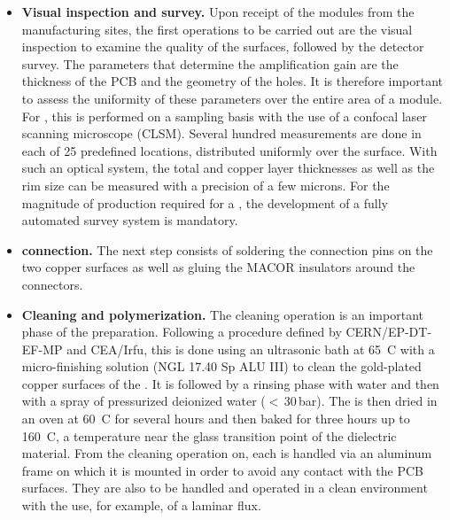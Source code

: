 \begin{itemize}
\item {\bf Visual inspection and survey.} Upon receipt of the  modules from the manufacturing sites, the first operations to be carried out are the visual inspection to examine the quality of the  surfaces, %
followed by the detector survey. The parameters that determine the  amplification gain are the thickness of the PCB and the geometry of the holes. It is therefore important to assess the uniformity of these parameters over the entire area of a  module. For  , this is performed on a sampling basis with the use of a confocal laser scanning microscope (CLSM). Several hundred measurements are done in each of \num{25} predefined locations, distributed uniformly over the  surface. With such an optical system, the total  and copper layer thicknesses as well as the rim size can be measured with a precision of a few microns.  %
For the magnitude of production required for a , the development of a fully automated survey system is mandatory. 

\item {\bf {} connection.} The next step consists of soldering the  connection pins on the two  copper surfaces as well as gluing the MACOR insulators around the connectors.

\item {\bf Cleaning and polymerization.} The cleaning operation is an important phase of the  preparation. Following a procedure defined by CERN/EP-DT-EF-MP and CEA/Irfu,
 this is done using an ultrasonic bath at \SI{65}{C} with a micro-finishing solution (NGL 17.40 Sp ALU III) to clean the gold-plated copper surfaces of the . It is followed by a rinsing phase with water and then with a spray of pressurized deionized water %
 ($<$\,30\,bar). The  is then dried in an oven 
at \SI{60}{C}  for several hours and then baked for three hours up to \SI{160}{C}, %
a temperature near the glass transition point of the dielectric material. From the cleaning operation on, each  is handled via an aluminum frame on which it is mounted in order to avoid any contact with the PCB surfaces. They are also to be %
handled and operated in a clean environment with the use, for example, of a laminar flux.  


\end{itemize}
